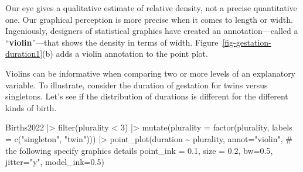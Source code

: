 \documentclass[
  letterpaper,
  DIV=11,
  numbers=noendperiod,
  oneside]{scrartcl}
\newenvironment{Shaded}{\begin{snugshade}}{\end{snugshade}}
\newcommand{\AttributeTok}[1]{\textcolor[rgb]{0.40,0.45,0.13}{#1}}
\newcommand{\CommentTok}[1]{\textcolor[rgb]{0.37,0.37,0.37}{#1}}
\newcommand{\DecValTok}[1]{\textcolor[rgb]{0.68,0.00,0.00}{#1}}
\newcommand{\FloatTok}[1]{\textcolor[rgb]{0.68,0.00,0.00}{#1}}
\newcommand{\FunctionTok}[1]{\textcolor[rgb]{0.28,0.35,0.67}{#1}}
\newcommand{\NormalTok}[1]{\textcolor[rgb]{0.00,0.23,0.31}{#1}}
\newcommand{\SpecialCharTok}[1]{\textcolor[rgb]{0.37,0.37,0.37}{#1}}
\newcommand{\StringTok}[1]{\textcolor[rgb]{0.13,0.47,0.30}{#1}}
\begin{document}
Our eye gives a qualitative estimate of relative density, not a precise
quantitative one. Our graphical perception is more precise when it comes
to length or width. Ingeniously, designers of statistical graphics have
created an annotation---called a ``\textbf{violin}''---that shows the
density in terms of width. Figure~\ref{fig-gestation-duration1}(b) adds
a violin annotation to the point plot.

\begin{tcolorbox}[enhanced jigsaw, colbacktitle=quarto-callout-note-color!10!white, opacityback=0, breakable, opacitybacktitle=0.6, colback=white, coltitle=black, arc=.35mm, title=\textcolor{quarto-callout-note-color}{\faInfo}\hspace{0.5em}{Example: Do twins take longer?}, left=2mm, colframe=quarto-callout-note-color-frame, rightrule=.15mm, bottomrule=.15mm, leftrule=.75mm, bottomtitle=1mm, toptitle=1mm, titlerule=0mm, toprule=.15mm]

Violins can be informative when comparing two or more levels of an
explanatory variable. To illustrate, consider the duration of gestation
for twins versus singletons. Let's see if the distribution of durations
is different for the different kinds of birth.

\begin{Shaded}
\begin{Highlighting}[]
\NormalTok{Births2022 }\SpecialCharTok{|\textgreater{}} 
  \FunctionTok{filter}\NormalTok{(plurality }\SpecialCharTok{\textless{}} \DecValTok{3}\NormalTok{) }\SpecialCharTok{|\textgreater{}}
  \FunctionTok{mutate}\NormalTok{(}\AttributeTok{plurality =} \FunctionTok{factor}\NormalTok{(plurality, }\AttributeTok{labels =} \FunctionTok{c}\NormalTok{(}\StringTok{"singleton"}\NormalTok{, }\StringTok{"twin"}\NormalTok{))) }\SpecialCharTok{|\textgreater{}}
  \FunctionTok{point\_plot}\NormalTok{(duration }\SpecialCharTok{\textasciitilde{}}\NormalTok{ plurality,  }\AttributeTok{annot=}\StringTok{"violin"}\NormalTok{,}
            \CommentTok{\# the following specify graphics details }
            \AttributeTok{point\_ink =} \FloatTok{0.1}\NormalTok{, }\AttributeTok{size =} \FloatTok{0.2}\NormalTok{, }\AttributeTok{bw=}\FloatTok{0.5}\NormalTok{, }
            \AttributeTok{jitter=}\StringTok{"y"}\NormalTok{, }\AttributeTok{model\_ink=}\FloatTok{0.5}\NormalTok{) }
\end{Highlighting}
\end{Shaded}

\begin{figure}[H]


\end{figure}
\end{tcolorbox}
\end{document}

